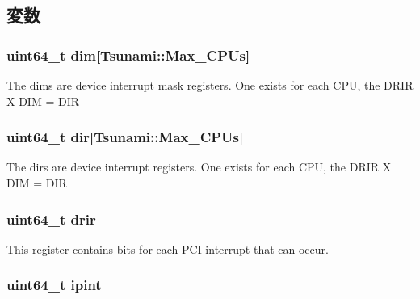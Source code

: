 \subsection{変数}
\hypertarget{classTsunamiCChip_ad791aec1b6c30bc2e0d2a6e2016ea3ba}{
\subsubsection[{dim}]{\setlength{\rightskip}{0pt plus 5cm}uint64\_\-t {\bf dim}\mbox{[}{\bf Tsunami::Max\_\-CPUs}\mbox{]}}}
\label{classTsunamiCChip_ad791aec1b6c30bc2e0d2a6e2016ea3ba}
The dims are device interrupt mask registers. One exists for each CPU, the DRIR X DIM = DIR \hypertarget{classTsunamiCChip_a41f0c570ffaf676a652c72cca47f743a}{
\subsubsection[{dir}]{\setlength{\rightskip}{0pt plus 5cm}uint64\_\-t {\bf dir}\mbox{[}{\bf Tsunami::Max\_\-CPUs}\mbox{]}}}
\label{classTsunamiCChip_a41f0c570ffaf676a652c72cca47f743a}
The dirs are device interrupt registers. One exists for each CPU, the DRIR X DIM = DIR \hypertarget{classTsunamiCChip_aa506ee56b76eeb7c0ffa0112c07799e7}{
\subsubsection[{drir}]{\setlength{\rightskip}{0pt plus 5cm}uint64\_\-t {\bf drir}}}
\label{classTsunamiCChip_aa506ee56b76eeb7c0ffa0112c07799e7}
This register contains bits for each PCI interrupt that can occur. \hypertarget{classTsunamiCChip_aa814845b1fc114b393e125f86d7dc57e}{
\subsubsection[{ipint}]{\setlength{\rightskip}{0pt plus 5cm}uint64\_\-t {\bf ipint}}}
